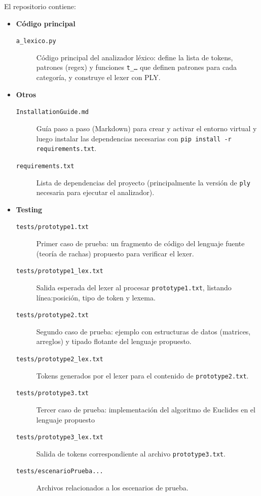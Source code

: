 \documentclass{article}
\begin{document}
El repositorio contiene:
\begin{itemize}
  \item \textbf{Código principal}
  \begin{description}
    \item[\texttt{a\_lexico.py}] Código principal del analizador léxico: 
      define la lista de tokens, patrones (regex) y funciones \texttt{t\_…} que definen patrones
      para cada categoría, y construye el lexer con PLY.
  \end{description}

  \item \textbf{Otros}
  \begin{description}
    \item[\texttt{InstallationGuide.md}] Guía paso a paso (Markdown) para crear y 
      activar el entorno virtual y luego instalar las dependencias necesarias con 
      \texttt{pip install -r requirements.txt}.
    \item[\texttt{requirements.txt}] Lista de dependencias del proyecto 
      (principalmente la versión de \texttt{ply} necesaria para ejecutar el analizador).
  \end{description}

  \item \textbf{Testing}
  \begin{description}
    \item[\texttt{tests/prototype1.txt}] Primer caso de prueba: un 
      fragmento de código del lenguaje fuente (teoría de rachas) propuesto para verificar el lexer.
    \item[\texttt{tests/prototype1\_lex.txt}] Salida esperada del lexer al 
        procesar \texttt{prototype1.txt}, listando línea:posición, tipo de token y lexema.
    \item[\texttt{tests/prototype2.txt}] Segundo caso de prueba: ejemplo con estructuras de 
        datos (matrices, arreglos) y tipado flotante del lenguaje propuesto.
    \item[\texttt{tests/prototype2\_lex.txt}] Tokens generados por el lexer para el contenido 
        de \texttt{prototype2.txt}.
    \item[\texttt{tests/prototype3.txt}] Tercer caso de prueba: implementación 
        del algoritmo de Euclides en el lenguaje propuesto
    \item[\texttt{tests/prototype3\_lex.txt}] Salida de tokens correspondiente al 
        archivo \texttt{prototype3.txt}.
    \item [\texttt{tests/escenarioPrueba...}] Archivos relacionados a los escenarios de prueba.
  \end{description}
\end{itemize}
\end{document}
